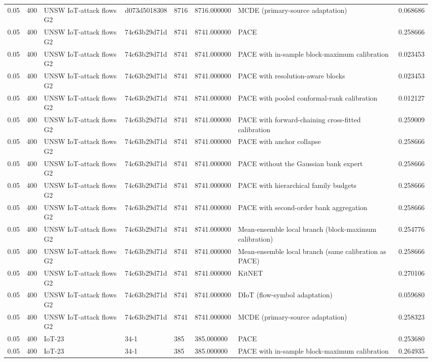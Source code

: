 \begin{tabular}{llllllll}
0.05 & 400 & UNSW IoT-attack flows G2 & d073d5018308 & 8716 & 8716.000000 & MCDE (primary-source adaptation) & 0.068686 \\
0.05 & 400 & UNSW IoT-attack flows G2 & 74c63b29d71d & 8741 & 8741.000000 & PACE & 0.258666 \\
0.05 & 400 & UNSW IoT-attack flows G2 & 74c63b29d71d & 8741 & 8741.000000 & PACE with in-sample block-maximum calibration & 0.023453 \\
0.05 & 400 & UNSW IoT-attack flows G2 & 74c63b29d71d & 8741 & 8741.000000 & PACE with resolution-aware blocks & 0.023453 \\
0.05 & 400 & UNSW IoT-attack flows G2 & 74c63b29d71d & 8741 & 8741.000000 & PACE with pooled conformal-rank calibration & 0.012127 \\
0.05 & 400 & UNSW IoT-attack flows G2 & 74c63b29d71d & 8741 & 8741.000000 & PACE with forward-chaining cross-fitted calibration & 0.259009 \\
0.05 & 400 & UNSW IoT-attack flows G2 & 74c63b29d71d & 8741 & 8741.000000 & PACE with anchor collapse & 0.258666 \\
0.05 & 400 & UNSW IoT-attack flows G2 & 74c63b29d71d & 8741 & 8741.000000 & PACE without the Gaussian bank expert & 0.258666 \\
0.05 & 400 & UNSW IoT-attack flows G2 & 74c63b29d71d & 8741 & 8741.000000 & PACE with hierarchical family budgets & 0.258666 \\
0.05 & 400 & UNSW IoT-attack flows G2 & 74c63b29d71d & 8741 & 8741.000000 & PACE with second-order bank aggregation & 0.258666 \\
0.05 & 400 & UNSW IoT-attack flows G2 & 74c63b29d71d & 8741 & 8741.000000 & Mean-ensemble local branch (block-maximum calibration) & 0.254776 \\
0.05 & 400 & UNSW IoT-attack flows G2 & 74c63b29d71d & 8741 & 8741.000000 & Mean-ensemble local branch (same calibration as PACE) & 0.258666 \\
0.05 & 400 & UNSW IoT-attack flows G2 & 74c63b29d71d & 8741 & 8741.000000 & KitNET & 0.270106 \\
0.05 & 400 & UNSW IoT-attack flows G2 & 74c63b29d71d & 8741 & 8741.000000 & DIoT (flow-symbol adaptation) & 0.059680 \\
0.05 & 400 & UNSW IoT-attack flows G2 & 74c63b29d71d & 8741 & 8741.000000 & MCDE (primary-source adaptation) & 0.258323 \\
0.05 & 400 & IoT-23 & 34-1 & 385 & 385.000000 & PACE & 0.253680 \\
0.05 & 400 & IoT-23 & 34-1 & 385 & 385.000000 & PACE with in-sample block-maximum calibration & 0.264935 \\

\end{tabular}

